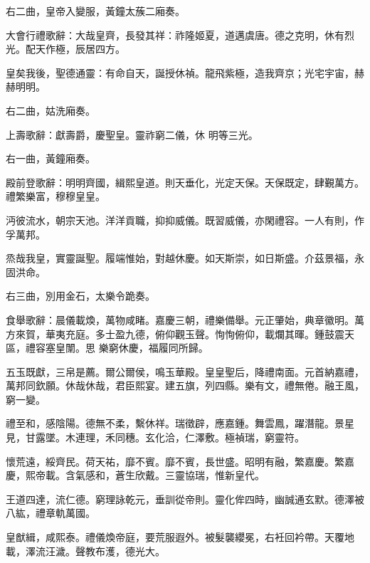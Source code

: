 \begin{pinyinscope}
 右二曲，皇帝入變服，黃鐘太蔟二廂奏。



 大會行禮歌辭：大哉皇齊，長發其祥：祚隆姬夏，道邁虞唐。德之克明，休有烈光。配天作極，辰居四方。



 皇矣我後，聖德通靈：有命自天，誕授休禎。龍飛紫極，造我齊京；光宅宇宙，赫赫明明。



 右二曲，姑洗廂奏。



 上壽歌辭：獻壽爵，慶聖皇。靈祚窮二儀，休
 明等三光。



 右一曲，黃鐘廂奏。



 殿前登歌辭：明明齊國，緝熙皇道。則天垂化，光定天保。天保既定，肆覲萬方。禮繁樂富，穆穆皇皇。



 沔彼流水，朝宗天池。洋洋貢職，抑抑威儀。既習威儀，亦閑禮容。一人有則，作孚萬邦。



 烝哉我皇，實靈誕聖。履端惟始，對越休慶。如天斯崇，如日斯盛。介茲景福，永固洪命。



 右三曲，別用金石，太樂令跪奏。



 食舉歌辭：晨儀載煥，萬物咸睹。嘉慶三朝，禮樂備舉。元正肇始，典章徽明。萬方來賀，華夷充庭。多士盈九德，俯仰觀玉聲。恂恂俯仰，載爛其暉。鍾鼓震天區，禮容塞皇闈。思
 樂窮休慶，福履同所歸。



 五玉既獻，三帛是薦。爾公爾侯，鳴玉華殿。皇皇聖后，降禮南面。元首納嘉禮，萬邦同欽願。休哉休哉，君臣熙宴。建五旗，列四縣。樂有文，禮無倦。融王風，窮一變。



 禮至和，感陰陽。德無不柔，繫休祥。瑞徵辟，應嘉鍾。舞雲鳳，躍潛龍。景星見，甘露墜。木連理，禾同穗。玄化洽，仁澤敷。極禎瑞，窮靈符。



 懷荒遠，綏齊民。荷天祐，靡不賓。靡不賓，長世盛。昭明有融，繁嘉慶。繁嘉慶，熙帝載。含氣感和，蒼生欣戴。三靈協瑞，惟新皇代。



 王道四達，流仁德。窮理詠乾元，垂訓從帝則。靈化侔四時，幽誠通玄默。德澤被八紘，禮章軌萬國。



 皇猷緝，咸熙泰。禮儀煥帝庭，要荒服遐外。被髮襲纓冕，右衽回衿帶。天覆地載，澤流汪濊。聲教布濩，德光大。




\end{pinyinscope}
